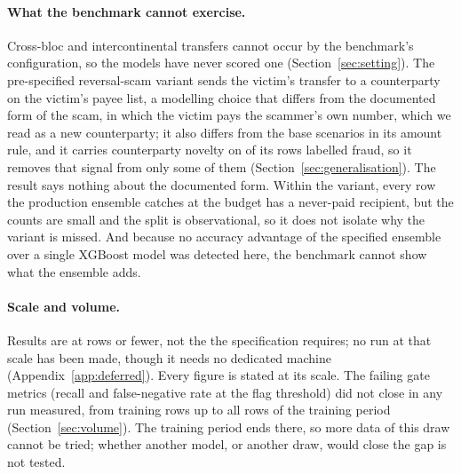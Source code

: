 \paragraph{What the benchmark cannot exercise.} Cross-bloc and intercontinental transfers cannot occur
by the benchmark's configuration, so the models have never scored one (Section~\ref{sec:setting}).
The pre-specified reversal-scam variant sends the victim's transfer to a counterparty on the
victim's payee list, a modelling choice that differs from the documented form of the scam, in which
the victim pays the scammer's own number, which we read as a new counterparty; it also differs from
the base scenarios in its amount rule, and it carries counterparty novelty on \nRevNovelScored{} of its \nRevFraud{} rows labelled fraud, so
it removes that signal from only some of them (Section~\ref{sec:generalisation}). The result says nothing about the
documented form. Within the variant, every row the production ensemble catches at the \nFPRBudget{} budget has a never-paid
recipient, but the counts are small and the split is observational, so it does not isolate why the
variant is missed. And because no accuracy advantage
of the specified ensemble over a single XGBoost model was detected here, the benchmark cannot show
what the ensemble adds.

\paragraph{Scale and volume.} Results are at \nRowsDrawB{} rows or fewer, not the \nSpecRows{} the
specification requires; no run at that scale has been made, though it needs no dedicated machine
(Appendix~\ref{app:deferred}). Every figure is stated at its scale. The failing gate metrics (recall and false-negative rate at the flag threshold) did not
close in any run measured, from \nLcTrainA{} training rows up to all \nFvTrainRows{} rows of the
training period (Section~\ref{sec:volume}). The training period ends there, so more data of this
draw cannot be tried; whether another model, or another draw, would close the gap is not tested.

